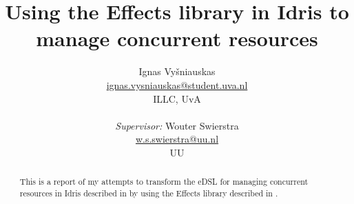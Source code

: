 \documentclass{article}
\title{Using the Effects library in Idris to manage concurrent resources}
\author{Ignas Vyšniauskas \\ \url{ignas.vysniauskas@student.uva.nl} \\
        ILLC, UvA \\
    \\ \textit{Supervisor:} Wouter Swierstra
    \\ \url{w.s.swierstra@uu.nl}
    \\ UU
}
\begin{document}
\maketitle

\begin{abstract}
    This is a report of my attempts to transform the eDSL for managing
    concurrent resources in Idris described in \cite{cbconc-fi} by using the
    Effects library described in \cite{effects-idr}.
\end{abstract}









\end{document}
